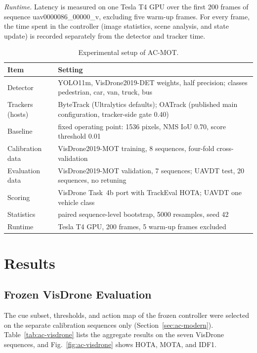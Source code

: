 \emph{Runtime.} Latency is measured on one Tesla T4 GPU over the first 200 frames of sequence uav0000086\_00000\_v, excluding five warm-up frames. For every frame, the time spent in the controller (image statistics, scene analysis, and state update) is recorded separately from the detector and tracker time.

\begin{table}[tbp]
\centering
\caption{Experimental setup of AC-MOT.}
\label{tab:ac-setup}
\begin{tabular}{>{\raggedright\arraybackslash}p{3.2cm}>{\raggedright\arraybackslash}p{11.2cm}}
\toprule
Item & Setting\\
\midrule
Detector & YOLO11m, VisDrone2019-DET weights, half precision; classes pedestrian, car, van, truck, bus\\
Trackers (hosts) & ByteTrack (Ultralytics defaults); OATrack (published main configuration, tracker-side gate 0.40)\\
Baseline & fixed operating point: 1536 pixels, NMS IoU 0.70, score threshold 0.01\\
Calibration data & VisDrone2019-MOT training, 8 sequences, four-fold cross-validation\\
Evaluation data & VisDrone2019-MOT validation, 7 sequences; UAVDT test, 20 sequences, no retuning\\
Scoring & VisDrone Task~4b port with TrackEval HOTA; UAVDT one vehicle class\\
Statistics & paired sequence-level bootstrap, 5000 resamples, seed 42\\
Runtime & Tesla T4 GPU, 200 frames, 5 warm-up frames excluded\\
\bottomrule
\end{tabular}
\end{table}

\section{Results}\label{sec:ac-results}

\subsection{Frozen VisDrone Evaluation}\label{sec:ac-res-visdrone}
The cue subset, thresholds, and action map of the frozen controller were selected on the separate calibration sequences only (Section~\ref{sec:ac-modern}). Table~\ref{tab:ac-visdrone} lists the aggregate results on the seven VisDrone sequences, and Fig.~\ref{fig:ac-visdrone} shows HOTA, MOTA, and IDF1.

